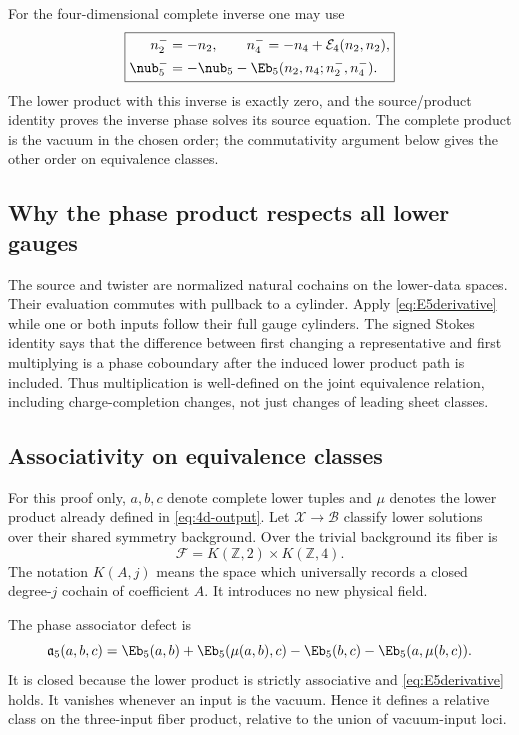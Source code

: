 For the four-dimensional complete inverse one may use
\begin{equation}\label{eq:complete-inverse}
 \boxed{\begin{aligned}
 n_2^-&=-n_2,\qquad n_4^-=-n_4+\mathcal E_4(n_2,n_2),\\
 \nub_5^-&=-\nub_5
  -\Eb_5(n_2,n_4;n_2^-,n_4^-).
 \end{aligned}}
\end{equation}
The lower product with this inverse is exactly zero, and the source/product identity proves the inverse phase solves its source equation. The complete product is the vacuum in the chosen order; the commutativity argument below gives the other order on equivalence classes.

\subsection{Why the phase product respects all lower gauges}
The source and twister are normalized natural cochains on the lower-data spaces. Their evaluation commutes with pullback to a cylinder. Apply \eqref{eq:E5derivative} while one or both inputs follow their full gauge cylinders. The signed Stokes identity says that the difference between first changing a representative and first multiplying is a phase coboundary after the induced lower product path is included. Thus multiplication is well-defined on the joint equivalence relation, including charge-completion changes, not just changes of leading sheet classes.

\subsection{Associativity on equivalence classes}
For this proof only, $a,b,c$ denote complete lower tuples and $\mu$ denotes the lower product already defined in \eqref{eq:4d-output}. Let $\mathscr X\to\mathscr B$ classify lower solutions over their shared symmetry background. Over the trivial background its fiber is
\begin{equation}\label{eq:lowerfiber}
 \mathscr F=K(\mathbb Z,2)\times K(\mathbb Z,4).
\end{equation}
The notation $K(A,j)$ means the space which universally records a closed degree-$j$ cochain of coefficient $A$. It introduces no new physical field.

The phase associator defect is
\begin{equation}\label{eq:assocdef4}
 \mathfrak a_5(a,b,c)
 =\Eb_5(a,b)+\Eb_5(\mu(a,b),c)
  -\Eb_5(b,c)-\Eb_5(a,\mu(b,c)).
\end{equation}
It is closed because the lower product is strictly associative and \eqref{eq:E5derivative} holds. It vanishes whenever an input is the vacuum. Hence it defines a relative class on the three-input fiber product, relative to the union of vacuum-input loci.

